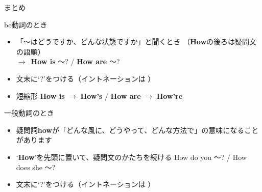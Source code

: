 \documentclass[aspectratio=169,xcolor={dvipsnames,table}]{beamer}
\begin{document}
\begin{frame}[plain]{まとめ}
 \begin{exampleblock}{be動詞のとき}\small
\begin{itemize}[square]\small
 \item 「〜はどうですか、どんな状態ですか」と聞くとき
（{\bfseries How}の後ろは疑問文の語順）\\
$\longrightarrow$\,\,\,{\bfseries How is} 〜? / {\bfseries How are} 〜?
 \item   文末に`?'をつける（イントネーションは\myDownwardPitch{}\,\,）
 \item 短縮形 {\bfseries How is} $\longrightarrow$ {\bfseries How's} / {\bfseries How are} $\longrightarrow$ {\bfseries How're}
\end{itemize}
     \end{exampleblock}

\begin{exampleblock}{一般動詞のとき}\small
\begin{itemize}[square]\small
 \item 疑問詞{\bfseries how}が「どんな風に、どうやって、どんな方法で」の意味になることがあります
 \item `{\bfseries How}'を先頭に置いて、疑問文のかたちを続ける\,\,How do you  〜? / How does she 〜? 
 \item   文末に`?'をつける（イントネーションは\myDownwardPitch{}\,\,）
\end{itemize}
     \end{exampleblock}
\end{frame}
\end{document}
